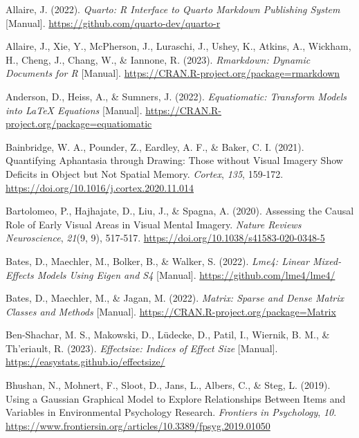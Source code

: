 \documentclass[
  12pt,
]{article}
\newlength{\cslhangindent}
\newlength{\cslentryspacingunit} %
\newenvironment{CSLReferences}[2] %
 {%
  \setlength{\parindent}{0pt}
  \ifodd #1
  \let\oldpar\par
  \def\par{\hangindent=\cslhangindent\oldpar}
  \fi
  \setlength{\parskip}{#2\cslentryspacingunit}
 }%
 {}
\begin{document}
\hypertarget{refs}{}
\begin{CSLReferences}{1}{0}
\leavevmode{}%
Allaire, J. (2022). \emph{Quarto: {R} Interface to Quarto Markdown
Publishing System} {[}Manual{]}.
\url{https://github.com/quarto-dev/quarto-r}

\leavevmode{}%
Allaire, J., Xie, Y., McPherson, J., Luraschi, J., Ushey, K., Atkins,
A., Wickham, H., Cheng, J., Chang, W., \& Iannone, R. (2023).
\emph{Rmarkdown: {Dynamic} Documents for {R}} {[}Manual{]}.
\url{https://CRAN.R-project.org/package=rmarkdown}

\leavevmode{}%
Anderson, D., Heiss, A., \& Sumners, J. (2022). \emph{Equatiomatic:
{Transform} Models into {LaTeX} Equations} {[}Manual{]}.
\url{https://CRAN.R-project.org/package=equatiomatic}

\leavevmode{}%
Bainbridge, W. A., Pounder, Z., Eardley, A. F., \& Baker, C. I. (2021).
Quantifying Aphantasia through Drawing: {Those} without Visual Imagery
Show Deficits in Object but Not Spatial Memory. \emph{Cortex},
\emph{135}, 159‑172. \url{https://doi.org/10.1016/j.cortex.2020.11.014}

\leavevmode{}%
Bartolomeo, P., Hajhajate, D., Liu, J., \& Spagna, A. (2020). Assessing
the Causal Role of Early Visual Areas in Visual Mental Imagery.
\emph{Nature Reviews Neuroscience}, \emph{21}(9, 9), 517‑517.
\url{https://doi.org/10.1038/s41583-020-0348-5}

\leavevmode{}%
Bates, D., Maechler, M., Bolker, B., \& Walker, S. (2022). \emph{Lme4:
{Linear} Mixed-Effects Models Using Eigen and {S4}} {[}Manual{]}.
\url{https://github.com/lme4/lme4/}

\leavevmode{}%
Bates, D., Maechler, M., \& Jagan, M. (2022). \emph{Matrix: {Sparse} and
Dense Matrix Classes and Methods} {[}Manual{]}.
\url{https://CRAN.R-project.org/package=Matrix}

\leavevmode{}%
Ben-Shachar, M. S., Makowski, D., Lüdecke, D., Patil, I., Wiernik, B.
M., \& Th'eriault, R. (2023). \emph{Effectsize: {Indices} of Effect
Size} {[}Manual{]}. \url{https://easystats.github.io/effectsize/}

\leavevmode{}%
Bhushan, N., Mohnert, F., Sloot, D., Jans, L., Albers, C., \& Steg, L.
(2019). Using a {Gaussian Graphical Model} to {Explore Relationships
Between Items} and {Variables} in {Environmental Psychology Research}.
\emph{Frontiers in Psychology}, \emph{10}.
\url{https://www.frontiersin.org/articles/10.3389/fpsyg.2019.01050}


\end{CSLReferences}
\end{document}
